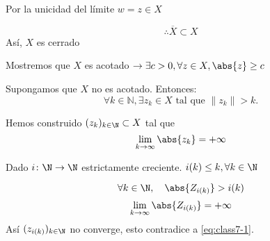 {Por la unicidad del límite $w = z \in X$

$$
	\therefore \overline{X}  \subset X
$$
Así, $X$ es cerrado

Mostremos que $X$ es acotado $\rightarrow \exists c>0, \forall z \in X, \abs{z} \geq c$

Supongamos que \( X \) no es acotado. Entonces:
\begin{equation}
	\forall k \in \mathbb{N}, \exists z_k \in X \text{ tal que } \|z_k\| > k.
	\label{eq:class7-3}
\end{equation}


Hemos construido $(z_k)_{k \in \N} \subset X$ tal que $$
	\lim_{k \to \infty} \abs{z_k} = +\infty$$

Dado  $i \colon \N \to \N$ estrictamente creciente. $i(k) \leq k, \forall k \in \N$

$$
	\forall k \in \N, \quad \abs{Z_{i(k)}} > i(k)
$$
$$
	\lim_{k \to \infty} \abs{Z_{i(k)}} = +\infty
$$
Así $(z_{i(k)})_{k \in \N} $ no converge, esto contradice a \eqref{eq:class7-1}.

}



